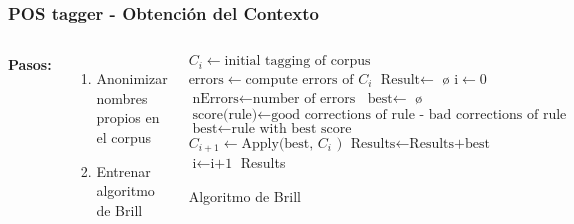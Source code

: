\documentclass{beamer}
\begin{document}
\begin{frame}[fragile]
\frametitle{POS tagger - Obtención del Contexto}
\begin{columns}[t] %
\textbf{Pasos:}
\begin{enumerate}
\item Anonimizar nombres propios en el corpus
\item Entrenar algoritmo de Brill
\end{enumerate}
\begin{algorithm}[H]
\begin{tiny}\fontsize{7}{8}\selectfont
    \begin{algorithmic}[1]
    \State $\text{$C_{i}$} \gets \text{initial tagging of corpus}$
\State $\text{errors} \gets \text{compute errors of $C_{i}$}$
\State $\text{Result} \gets$ \o
\State $\text{i} \gets 0$
\State $\text{nErrors} \gets \text{number of errors}$
\State $\text{best}  \gets$ \o
{} 
            \State $\text{score(rule)} \gets \text{good corrections of rule -
             bad corrections of rule}$ 
            \EndFor
        \EndFor
        \State $\text{best} \gets \text{rule with best score}$
		\State $\text{$C_{i+1}$} \gets \text{Apply(best, $C_{i}$ )}$
		\State $\text{Results} \gets \text{Results+best}$
		\State $\text{i} \gets \text{i+1}$
        \EndWhile
        \EndProcedure
        \State \Return Results
    \end{algorithmic}
    \label{alg:rAP}
    \caption{Algoritmo de Brill}
    \end{tiny}
\end{algorithm}
\end{columns}
\end{frame}
\end{document}
